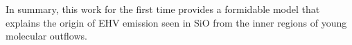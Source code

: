 \documentclass[useAMS,usenatbib]{mn2e}
\begin{document}
In summary, this work for the first time provides a formidable model
that explains the origin of EHV emission seen in SiO from 
the inner regions of young molecular outflows.





\label{lastpage}
\end{document}
